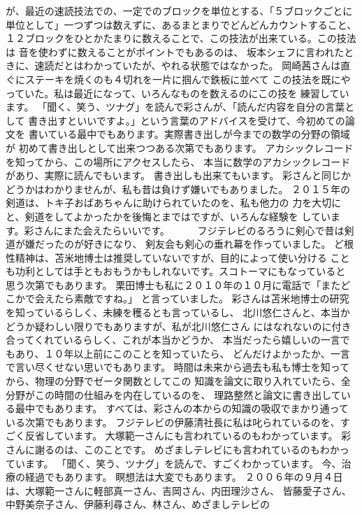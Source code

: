 \documentclass{jsarticle}
\begin{document}
が、最近の速読技法での、一定でのブロックを単位とする、「５ブロックごとに
単位として」一つずつは数えずに、あるまとまりでどんどんカウントすること、
１２ブロックをひとかたまりに数えることで、この技法が出来ている。この技法は
音を使わずに数えることがポイントでもあるのは、
坂本シェフに言われたときに、速読だとはわかっていたが、やれる状態ではなかった。
岡崎茜さんは直ぐにステーキを焼くのも４切れを一片に掴んで鉄板に並べて
この技法を既にやっていた。私は最近になって、いろんなものを数えるのにこの技を
練習しています。
「聞く、笑う、ツナグ」を読んで彩さんが、「読んだ内容を自分の言葉として
書き出すといいですよ。」という言葉のアドバイスを受けて、今初めての論文を
書いている最中でもあります。実際書き出しが今までの数学の分野の領域が
初めて書き出しとして出来つつある次第でもあります。
アカシックレコードを知ってから、この場所にアクセスしたら、
本当に数学のアカシックレコードがあり、実際に読んでもいます。
書き出しも出来てもいます。
彩さんと同じかどうかはわかりませんが、私も昔は負けず嫌いでもありました。
２０１５年の剣道は、トキ子おばあちゃんに助けられていたのを、私も他力の
力を大切にと、剣道をしてよかったかを後悔とまではですが、いろんな経験を
しています。彩さんにまた会えたらいいです。　　　
フジテレビのるろうに剣心で昔は剣道が嫌だったのが好きになり、
剣友会も剣心の垂れ幕を作っていました。
ど根性精神は、苫米地博士は推奨していないですが、目的によって使い分ける
ことも功利としては手ともおもうかもしれないです。スコトーマにもなっていると
思う次第でもあります。
栗田博士も私に２０１０年の１０月に電話で「またどこかで会えたら素敵ですね。」
と言っていました。
彩さんは苫米地博士の研究を知っているらしく、未練を穫るとも言っているし、
北川悠仁さんと、本当かどうか疑わしい限りでもありますが、私が北川悠仁さん
にはなれないのに付き合ってくれているらしく、これが本当かどうか、
本当だったら嬉しいの一言でもあり、１０年以上前にこのことを知っていたら、
どんだけよかったか、一言で言い尽くせない思いでもあります。
時間は未来から過去も私も博士を知ってから、物理の分野でゼータ関数としてこの
知識を論文に取り入れていたら、全分野がこの時間の仕組みを内在しているのを、
理路整然と論文に書き出している最中でもあります。
すべては、彩さんの本からの知識の吸収でまかり通っている次第でもあります。
フジテレビの伊藤清社長に私は叱られているのを、すごく反省しています。
大塚範一さんにも言われているのもわかっています。
彩さんに謝るのは、このことです。
めざましテレビにも言われているのもわかっています。
「聞く、笑う、ツナグ」を読んで、すごくわかっています。
今、治療の経過でもあります。
瞑想法は大変でもあります。
２００６年の９月４日は、大塚範一さんに軽部真一さん、吉岡さん、内田理沙さん、
皆藤愛子さん、中野美奈子さん、伊藤利尋さん、林さん、めざましテレビの
\end{document}
